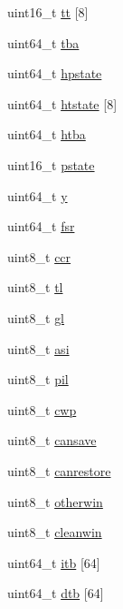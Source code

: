 \begin{DoxyCompactItemize}
\item 
uint16\_\-t \hyperlink{structSharedData_ace83e493af528c843d1890906edc5ff8}{tt} \mbox{[}8\mbox{]}
\item 
uint64\_\-t \hyperlink{structSharedData_a43324060a9385bf166885c934a9cd598}{tba}
\item 
uint64\_\-t \hyperlink{structSharedData_a58decf7f0bc43b43beb8873474514c71}{hpstate}
\item 
uint64\_\-t \hyperlink{structSharedData_ac76ca495726b087e7af09f12c954fd8e}{htstate} \mbox{[}8\mbox{]}
\item 
uint64\_\-t \hyperlink{structSharedData_a394227ebf5f2ab997956fe039b9d8c55}{htba}
\item 
uint16\_\-t \hyperlink{structSharedData_a86ec5b5820080e5a56aa670b8b05a7da}{pstate}
\item 
uint64\_\-t \hyperlink{structSharedData_a747cdfc01f99475e65b002cf67c7f850}{y}
\item 
uint64\_\-t \hyperlink{structSharedData_a671452da0a617e5f667a200a620572e0}{fsr}
\item 
uint8\_\-t \hyperlink{structSharedData_ac26e6920bbc86ef97a573fcc9b54942f}{ccr}
\item 
uint8\_\-t \hyperlink{structSharedData_a245b42e6f340c7874989d56608af5cb5}{tl}
\item 
uint8\_\-t \hyperlink{structSharedData_a285fa13127daefc218bebcdb2437ad1a}{gl}
\item 
uint8\_\-t \hyperlink{structSharedData_a04ffaeb169260b645b1d60977a569820}{asi}
\item 
uint8\_\-t \hyperlink{structSharedData_a66223bd530b4057219479647e23beed6}{pil}
\item 
uint8\_\-t \hyperlink{structSharedData_a58c702bc16d587a7bd7a38d609dea6d8}{cwp}
\item 
uint8\_\-t \hyperlink{structSharedData_a8c2517fd71f35530160c213a888da3d1}{cansave}
\item 
uint8\_\-t \hyperlink{structSharedData_ae3b835af923c28d728bce61558318f78}{canrestore}
\item 
uint8\_\-t \hyperlink{structSharedData_a9334dc0bb213267bd68a3a58139c48a1}{otherwin}
\item 
uint8\_\-t \hyperlink{structSharedData_a9b5d1f02751b96c813234ff9106a746c}{cleanwin}
\item 
uint64\_\-t \hyperlink{structSharedData_a5f62153d5d912c6d9d1470b8dc3d585a}{itb} \mbox{[}64\mbox{]}
\item 
uint64\_\-t \hyperlink{structSharedData_a66b9f29af51cbcf36211c26ea7cd1ea3}{dtb} \mbox{[}64\mbox{]}
\end{DoxyCompactItemize}



